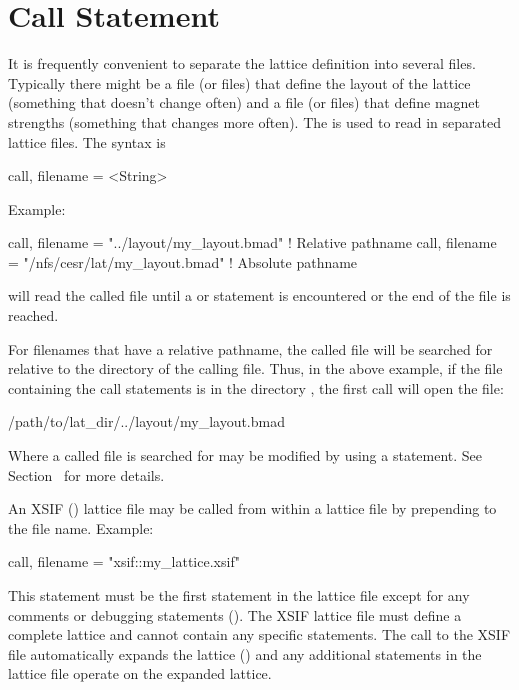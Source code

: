 {{%
\section{Call Statement}
\label{s:call}

It is frequently convenient to separate the lattice definition into
several files.  Typically there might be a file (or files) that define
the layout of the lattice (something that doesn't change often) and a
file (or files) that define magnet strengths (something that changes
more often).  The  is used to read in separated lattice
files. The syntax is
\begin{example}
  call, filename = <String>
\end{example}
Example:
\begin{example}
  call, filename = "../layout/my_layout.bmad"      ! Relative pathname
  call, filename = "/nfs/cesr/lat/my_layout.bmad"  ! Absolute pathname
\end{example}
\bmad will read the called file until a  or 
statement is encountered or the end of the file is reached.

For filenames that have a relative pathname, the called file will be
searched for relative to the directory of the calling file.  Thus, in
the above example, if the file containing the call statements is in the
directory , the first call will open the file:
\begin{example}
  /path/to/lat_dir/../layout/my_layout.bmad 
\end{example}

Where a called file is searched for may be modified by using a
 statement. See Section~ for
more details.

An XSIF () lattice file may be called
from within a \bmad lattice file by prepending  to the
file name. Example:
\begin{example}
  call, filename = "xsif::my_lattice.xsif"
\end{example}
This statement must be the first statement in the \bmad lattice file
except for any comments or debugging statements (). 
The XSIF lattice file must define a
complete lattice and cannot contain any \bmad specific statements. The
call to the XSIF file automatically expands the lattice
() and any additional statements in the \bmad lattice
file operate on the expanded lattice.

}}
